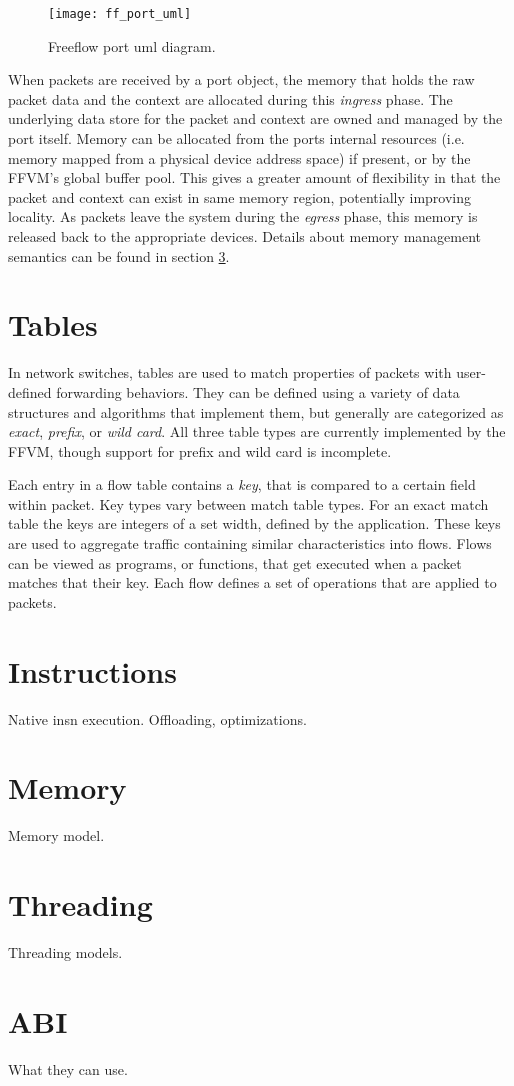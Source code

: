 \begin{figure}[h]
\centering
\texttt{[image: ff\_port\_uml]}
\caption{Freeflow port uml diagram.}
\label{port_uml}
\end{figure}

When packets are received by a port object, the memory that holds the raw
packet data and the context are allocated during this \emph{ingress} phase. The
underlying data store for the packet and context are owned and managed by the
port itself. Memory can be allocated from the ports internal resources (i.e.
memory mapped from a physical device address space) if present, or by the FFVM's
global buffer pool. This gives a greater amount of flexibility in that the
packet and context can exist in same memory region, potentially improving
locality. As packets leave the system during the \emph{egress} phase, this
memory is released back to the appropriate devices. Details about memory
management semantics can be found in section \ref{vm:memory}.

\section{Tables}
\label{vm:tables}
In network switches, tables are used to match properties of packets
with user-defined forwarding behaviors. They can be defined using a variety of
data structures and algorithms that implement them, but generally are categorized
as \emph{exact}, \emph{prefix}, or \emph{wild card}. All three table types are
currently implemented by the FFVM, though support for prefix and wild card is
incomplete.


Each entry in a flow table contains a \emph{key}, that is compared to a
certain field within packet. Key types vary between match table types. For an
exact match table the keys are integers of a set width, defined by the
application. These keys are used to aggregate traffic containing similar
characteristics into flows. Flows can be viewed as programs, or functions,
that get executed when a packet matches that their key. Each flow defines a
set of operations that are applied to packets.


\section{Instructions}
\label{vm:insn}
Native insn execution. Offloading, optimizations.

\section{Memory}
\label{vm:memory}
Memory model.

\section{Threading}
\label{vm:threading}
Threading models.

\section{ABI}
\label{vm:abi}
What they can use.
